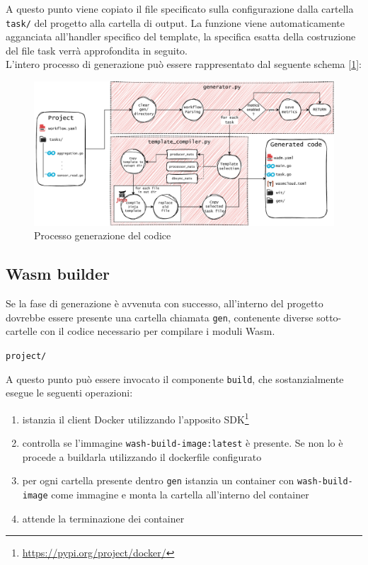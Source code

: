 A questo punto viene copiato il file specificato sulla configurazione dalla cartella \texttt{task/} del progetto alla cartella di output. La funzione viene automaticamente agganciata all'handler specifico del template, la specifica esatta della costruzione del file task verrà approfondita in seguito.\\
L'intero processo di generazione può essere rappresentato dal seguente schema [\ref{fig:code_gen_impl}]:

\FloatBarrier
\begin{figure}[h]
    \centering
    \includegraphics[width=\textwidth]{img/schemi/schemi-implementazione-gen.drawio.pdf}
    \caption{Processo generazione del codice}
    \label{fig:code_gen_impl}
\end{figure}
\FloatBarrier

\subsection{Wasm builder}

Se la fase di generazione è avvenuta con successo, all'interno del progetto dovrebbe essere presente una cartella chiamata \texttt{gen}, contenente diverse sotto-cartelle con il codice necessario per compilare i moduli Wasm.

\texttt{project/}

A questo punto può essere invocato il componente \texttt{build}, che sostanzialmente esegue le seguenti operazioni:
\begin{enumerate}
    \item istanzia il client Docker utilizzando l'apposito SDK\footnote{\url{https://pypi.org/project/docker/}}
    \item controlla se l'immagine \texttt{wash-build-image:latest} è presente. Se non lo è procede a buildarla utilizzando il dockerfile configurato
    \item per ogni cartella presente dentro \texttt{gen} istanzia un container con \texttt{wash-build-image} come immagine e monta la cartella all'interno del container
    \item attende la terminazione dei container
\end{enumerate}

